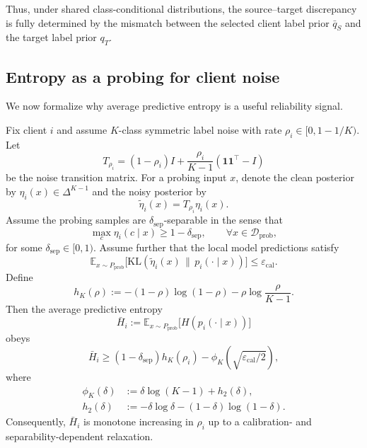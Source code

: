 Thus, under shared class-conditional distributions, the source--target discrepancy is fully determined by the mismatch between the selected client label prior $\bar q_S$ and the target label prior $q_T$.

\subsection{Entropy as a probing for client noise}
\label{app:entropy_probing}

We now formalize why average predictive entropy is a useful reliability signal.

\begin{proposition}
\label{prop:entropy_bridge_appendix}
Fix client $i$ and assume $K$-class symmetric label noise with rate $\rho_i\in[0,1-1/K)$. Let
\begin{equation}
T_{\rho_i}
=
(1-\rho_i)I + \frac{\rho_i}{K-1}(\mathbf{1}\mathbf{1}^\top-I)
\end{equation}
be the noise transition matrix. For a probing input $x$, denote the clean posterior by $\eta_i(x)\in\Delta^{K-1}$ and the noisy posterior by
\begin{equation}
\tilde \eta_i(x)=T_{\rho_i}\eta_i(x).
\end{equation}
Assume the probing samples are $\delta_{\mathrm{sep}}$-separable in the sense that
\begin{equation}
\max_c \eta_i(c\mid x) \ge 1-\delta_{\mathrm{sep}},
\qquad \forall x\in\mathcal{D}_{\mathrm{prob}},
\end{equation}
for some $\delta_{\mathrm{sep}}\in[0,1)$. Assume further that the local model predictions satisfy
\begin{equation}
\mathbb{E}_{x\sim P_{\mathrm{prob}}}
\big[
\mathrm{KL}(\tilde\eta_i(x)\,\|\,p_i(\cdot\mid x))
\big]
\le \varepsilon_{\mathrm{cal}}.
\end{equation}
Define
\begin{equation}
 h_K(\rho)
 :=
 -(1-\rho)\log(1-\rho)
 - \rho\log\frac{\rho}{K-1}.
\end{equation}
Then the average predictive entropy
\begin{equation}
\bar H_i
:=
\mathbb{E}_{x\sim P_{\mathrm{prob}}}
\big[H(p_i(\cdot\mid x))\big]
\end{equation}
obeys
\begin{equation}
\label{eq:entropy_bridge_appendix}
\bar H_i
\ge
(1-\delta_{\mathrm{sep}})h_K(\rho_i)
- \phi_K\!\left(\sqrt{\varepsilon_{\mathrm{cal}}/2}\right),
\end{equation}
where
\begin{align}
\phi_K(\delta)
&:=\delta\log(K-1)+h_2(\delta),\\
h_2(\delta)
&:=-\delta\log\delta-(1-\delta)\log(1-\delta).
\end{align}
Consequently, $\bar H_i$ is monotone increasing in $\rho_i$ up to a calibration- and separability-dependent relaxation.
\end{proposition}

